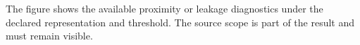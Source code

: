 The figure shows the available proximity or leakage diagnostics under the declared representation and threshold. The source scope is part of the result and must remain visible.
